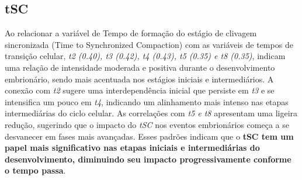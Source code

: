 \subsection*{tSC}
Ao relacionar a variável de Tempo de formação do estágio de clivagem sincronizada (Time to Synchronized Compaction) com as variáveis de tempos de transição celular, \textit{t2 (0.40), t3 (0.42), t4 (0.43), t5 (0.35) e t8 (0.35)}, indicam uma relação de intensidade moderada e positiva durante o desenvolvimento embrionário, sendo mais acentuada nos estágios iniciais e intermediários. A conexão com \textit{t2} sugere uma interdependência inicial que persiste em \textit{t3} e se intensifica um pouco em \textit{t4}, indicando um alinhamento mais intenso nas etapas intermediárias do ciclo celular. As correlações com \textit{t5 e t8} apresentam uma ligeira redução, sugerindo que o impacto do \textit{tSC} nos eventos embrionários começa a se desvanecer em fases mais avançadas. Esses padrões indicam que o \textbf{tSC tem um papel mais significativo nas etapas iniciais e intermediárias do desenvolvimento, diminuindo seu impacto progressivamente conforme o tempo passa}. 

